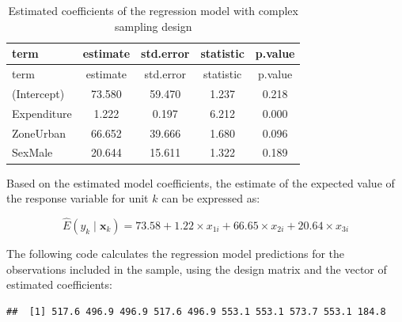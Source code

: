 \documentclass[
  english,
  12pt,
]{book}
\newenvironment{Shaded}{\begin{snugshade}}{\end{snugshade}}
\newcommand{\DecValTok}[1]{\textcolor[rgb]{0.00,0.00,0.81}{#1}}
\newcommand{\FunctionTok}[1]{\textcolor[rgb]{0.13,0.29,0.53}{\textbf{#1}}}
\newcommand{\NormalTok}[1]{#1}
\newcommand{\OtherTok}[1]{\textcolor[rgb]{0.56,0.35,0.01}{#1}}
\newcommand{\SpecialCharTok}[1]{\textcolor[rgb]{0.81,0.36,0.00}{\textbf{#1}}}
\begin{document}
\begin{longtable}[]{@{}lcccc@{}}
\caption{\label{tab:tab-coeficientes-modelo}Estimated coefficients of the regression model with complex sampling design}\tabularnewline
\toprule\noalign{}
term & estimate & std.error & statistic & p.value \\
\midrule\noalign{}
\endfirsthead
\toprule\noalign{}
term & estimate & std.error & statistic & p.value \\
\midrule\noalign{}
\endhead
\bottomrule\noalign{}
\endlastfoot
(Intercept) & 73.580 & 59.470 & 1.237 & 0.218 \\
Expenditure & 1.222 & 0.197 & 6.212 & 0.000 \\
ZoneUrban & 66.652 & 39.666 & 1.680 & 0.096 \\
SexMale & 20.644 & 15.611 & 1.322 & 0.189 \\
\end{longtable}

Based on the estimated model coefficients, the estimate of the expected value of the response variable for unit \(k\) can be expressed as:

\[
\hat{E}(y_{k}\mid\mathbf{x}_{k})=73.58+1.22 \times x_{1i}+66.65 \times x_{2i}+20.64  \times  x_{3i}
\]

The following code calculates the regression model predictions for the observations included in the sample, using the design matrix and the vector of estimated coefficients:

\begin{Shaded}
\end{Shaded}

\begin{verbatim}
##  [1] 517.6 496.9 496.9 517.6 496.9 553.1 553.1 573.7 553.1 184.8
\end{verbatim}
\end{document}
